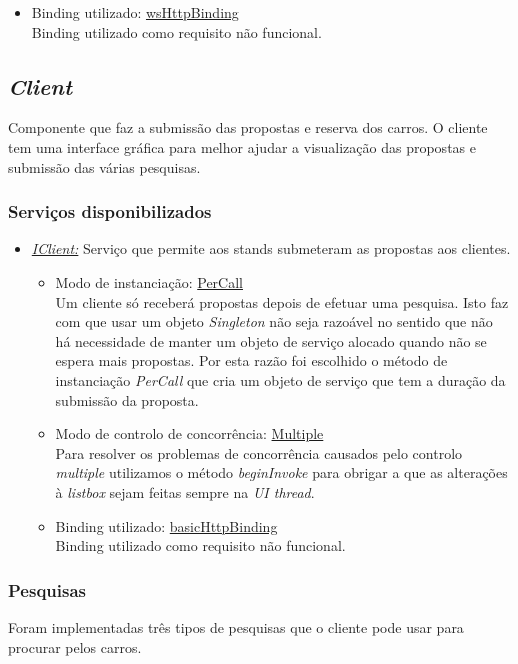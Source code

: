 \documentclass[a4paper]{article}
\begin{document}
\begin{itemize}
\begin{itemize}
		\item
		Binding utilizado: \underline{wsHttpBinding}\\
		Binding utilizado como requisito não funcional.
	\end{itemize}
\end{itemize}

\newpage


\subsection{\emph{Client}}
Componente que faz a submissão das propostas e reserva dos carros. O cliente tem uma interface gráfica para melhor ajudar a visualização das propostas e submissão das várias pesquisas.
\subsubsection{Serviços disponibilizados}
\begin{itemize} 

\item
\emph{\underline{IClient:}}
Serviço que permite aos stands submeteram as propostas aos clientes.
	\begin{itemize}
		\item
		Modo de instanciação: \underline{PerCall}\\
		Um cliente só receberá propostas depois de efetuar uma pesquisa. Isto faz com que usar um objeto \emph{Singleton} não seja razoável no sentido que não há necessidade de manter um objeto de serviço alocado quando não se espera mais propostas. Por esta razão foi escolhido o método de instanciação \emph{PerCall} que cria um objeto de serviço que tem a duração da submissão da proposta.
		\item
		Modo de controlo de concorrência: \underline{Multiple}\\
		Para resolver os problemas de concorrência causados pelo controlo \emph{multiple} utilizamos o método \emph{beginInvoke} para obrigar a que as alterações à \emph{listbox} sejam feitas sempre na \emph{UI thread}.
		
		\item
		Binding utilizado: \underline{basicHttpBinding}\\
		Binding utilizado como requisito não funcional.
	\end{itemize}
\end{itemize}

\subsubsection{Pesquisas}
Foram implementadas três tipos de pesquisas que o cliente pode usar para procurar pelos carros.
\end{document}
